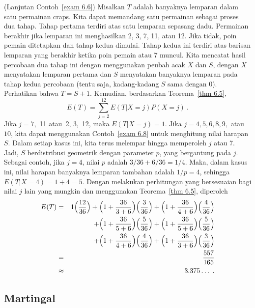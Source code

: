 \begin{example}(Lanjutan Contoh~\ref{exam 6.6}){\label{exam 6.10}}
Misalkan $T$ adalah banyaknya lemparan dalam satu permainan craps. Kita dapat memandang
satu permainan sebagai proses dua tahap. Tahap pertama terdiri atas satu lemparan
sepasang dadu. Permainan berakhir jika lemparan ini menghasilkan 2, 3, 7, 11, atau 12.
Jika tidak, poin pemain ditetapkan dan tahap kedua dimulai. Tahap kedua ini terdiri atas
barisan lemparan yang berakhir ketika poin pemain atau 7 muncul. Kita mencatat hasil
percobaan dua tahap ini dengan menggunakan peubah acak $X$ dan $S$, dengan $X$
menyatakan lemparan pertama dan $S$ menyatakan banyaknya lemparan pada tahap kedua
percobaan (tentu saja, kadang-kadang $S$ sama dengan 0). Perhatikan bahwa $T = S+1$.
Kemudian, berdasarkan Teorema~\ref{thm 6.5},
$$ E(T) = \sum_{j = 2}^{12} E(T|X = j) P(X = j)\ .
$$ Jika $j = 7$,~11 atau~2, 3,~12, maka $E(T|X = j) = 1$. Jika $j = 4, 5, 6, 8,
9,$ atau $10$, kita dapat menggunakan Contoh~\ref{exam 6.8} untuk menghitung nilai
harapan $S$. Dalam setiap kasus ini, kita terus melempar hingga memperoleh $j$ atau 7.
Jadi, $S$ berdistribusi geometrik dengan parameter $p$, yang bergantung pada $j$.
Sebagai contoh, jika $j = 4$, nilai $p$ adalah $3/36 + 6/36 = 1/4$. Maka, dalam
kasus ini, nilai harapan banyaknya lemparan tambahan adalah $1/p = 4$, sehingga
$E(T|X = 4) = 1 + 4 = 5$. Dengan melakukan perhitungan yang bersesuaian bagi nilai
$j$ lain yang mungkin dan menggunakan Teorema~\ref{thm 6.5}, diperoleh
\begin{eqnarray*} E(T) & = & 1\Bigl(\frac {12}{36}\Bigr)   
    + \Bigl(1 + \frac {36}{3 + 6}\Bigr)\Bigl(\frac 3{36}\Bigr)   
    + \Bigl(1 + \frac {36}{4 + 6}\Bigr)\Bigl(\frac 4{36}\Bigr) \\
& & + \Bigl(1 + \frac {36}{5 + 6}\Bigr)\Bigl(\frac 5{36}\Bigr)  
    + \Bigl(1 + \frac {36}{5 + 6}\Bigr)\Bigl(\frac 5{36}\Bigr) \\
& & + \Bigl(1 + \frac {36}{4 + 6}\Bigr)\Bigl(\frac 4{36}\Bigr) 
    + \Bigl(1 + \frac {36}{3 + 6}\Bigr)\Bigl(\frac 3{36}\Bigr) \\ 
& = & \frac {557}{165} \\
& \approx & 3.375\dots\ .
\end{eqnarray*}
\end{example}

\subsection*{Martingal}

